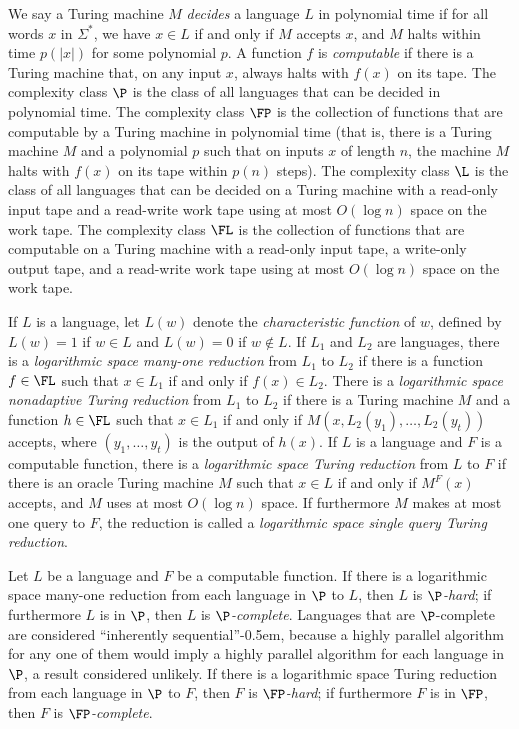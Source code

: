 \documentclass{article}
\begin{document}
We say a Turing machine $M$ \emph{decides} a language $L$ in polynomial time if for all words $x$ in $\Sigma^*$, we have $x \in L$ if and only if $M$ accepts $x$, and $M$ halts within time $p(|x|)$ for some polynomial $p$.
A function $f$ is \emph{computable} if there is a Turing machine that, on any input $x$, always halts with $f(x)$ on its tape.
The complexity class $\P$ is the class of all languages that can be decided in polynomial time.
The complexity class $\FP$ is the collection of functions that are computable by a Turing machine in polynomial time (that is, there is a Turing machine $M$ and a polynomial $p$ such that on inputs $x$ of length $n$, the machine $M$ halts with $f(x)$ on its tape within $p(n)$ steps).
The complexity class $\L$ is the class of all languages that can be decided on a Turing machine with a read-only input tape and a read-write work tape using at most $O(\log n)$ space on the work tape.
The complexity class $\FL$ is the collection of functions that are computable on a Turing machine with a read-only input tape, a write-only output tape, and a read-write work tape using at most $O(\log n)$ space on the work tape.

If $L$ is a language, let $L(w)$ denote the \emph{characteristic function} of $w$, defined by $L(w) = 1$ if $w \in L$ and $L(w) = 0$ if $w \notin L$.
If $L_1$ and $L_2$ are languages, there is a \emph{logarithmic space many-one reduction} from $L_1$ to $L_2$ if there is a function $f \in \FL$ such that $x \in L_1$ if and only if $f(x) \in L_2$.
There is a \emph{logarithmic space nonadaptive Turing reduction} from $L_1$ to $L_2$ if there is a Turing machine $M$ and a function $h \in \FL$ such that $x \in L_1$ if and only if $M(x, L_2(y_1), \dotsc, L_2(y_t))$ accepts, where $(y_1, \dotsc, y_t)$ is the output of $h(x)$.
If $L$ is a language and $F$ is a computable function, there is a \emph{logarithmic space Turing reduction} from $L$ to $F$ if there is an oracle Turing machine $M$ such that $x \in L$ if and only if $M^F(x)$ accepts, and $M$ uses at most $O(\log n)$ space.
If furthermore $M$ makes at most one query to $F$, the reduction is called a \emph{logarithmic space single query Turing reduction}.

Let $L$ be a language and $F$ be a computable function.
If there is a logarithmic space many-one reduction from each language in $\P$ to $L$, then $L$ is \emph{$\P$-hard}; if furthermore $L$ is in $\P$, then $L$ is \emph{$\P$-complete}.
Languages that are $\P$-complete are considered ``inherently sequential''\kern-0.5em, because a highly parallel algorithm for any one of them would imply a highly parallel algorithm for each language in $\P$, a result considered unlikely.
If there is a logarithmic space Turing reduction from each language in $\P$ to $F$, then $F$ is \emph{$\FP$-hard}; if furthermore $F$ is in $\FP$, then $F$ is \emph{$\FP$-complete}.
\end{document}
